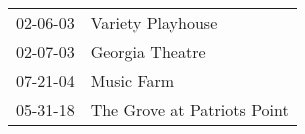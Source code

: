 \begin{supertabular}{p{0.07\textwidth}p{0.23\textwidth}}
 02-06-03 &            Variety Playhouse \\
 02-07-03 &              Georgia Theatre \\
 07-21-04 &                   Music Farm \\
 05-31-18 &  The Grove at Patriots Point \\
\end{supertabular}
